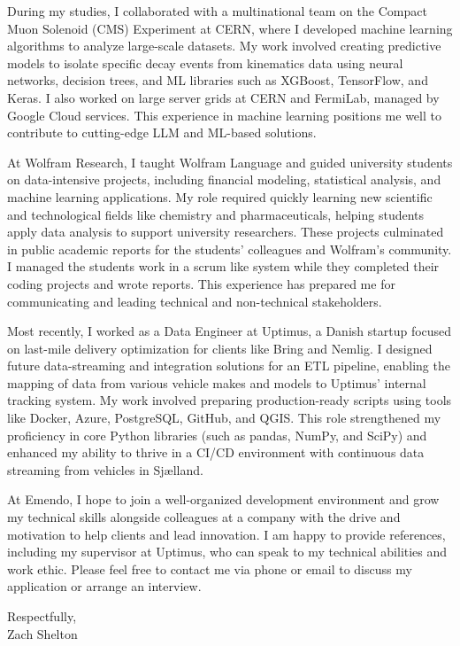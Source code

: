 \documentclass[11pt,a4]{article}
\begin{document}
During my studies, I collaborated with a multinational team on the Compact Muon Solenoid (CMS) Experiment at CERN, where I developed machine learning algorithms to analyze large-scale datasets. My work involved creating predictive models to isolate specific decay events from kinematics data using neural networks, decision trees, and ML libraries such as XGBoost, TensorFlow, and Keras. I also worked on large server grids at CERN and FermiLab, managed by Google Cloud services. This experience in machine learning positions me well to contribute to cutting-edge LLM and ML-based solutions.

At Wolfram Research, I taught Wolfram Language and guided university students on data-intensive projects, including financial modeling, statistical analysis, and machine learning applications. My role required quickly learning new scientific and technological fields like chemistry and pharmaceuticals, helping students apply data analysis to support university researchers. These projects culminated in public academic reports for the students' colleagues and Wolfram's community. I managed the students work in a scrum like system while they completed their coding projects and wrote reports. This experience has prepared me for communicating and leading technical and non-technical stakeholders.

Most recently, I worked as a Data Engineer at Uptimus, a Danish startup focused on last-mile delivery optimization for clients like Bring and Nemlig. I designed future data-streaming and integration solutions for an ETL pipeline, enabling the mapping of data from various vehicle makes and models to Uptimus' internal tracking system. My work involved preparing production-ready scripts using tools like Docker, Azure, PostgreSQL, GitHub, and QGIS. This role strengthened my proficiency in core Python libraries (such as pandas, NumPy, and SciPy) and enhanced my ability to thrive in a CI/CD environment with continuous data streaming from vehicles in Sjælland.

At Emendo, I hope to join a well-organized development environment and grow my technical skills alongside colleagues at a company with the drive and motivation to help clients and lead innovation. I am happy to provide references, including my supervisor at Uptimus, who can speak to my technical abilities and work ethic. Please feel free to contact me via phone or email to discuss my application or arrange an interview.
\par

\vspace{0.5cm}
\raggedright
Respectfully, \\ 
Zach Shelton \\ 
\end{document}
